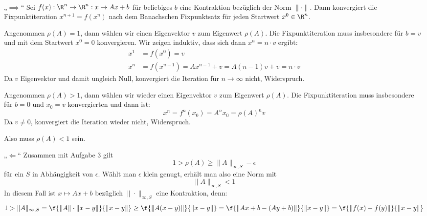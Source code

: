 \documentclass{mywork}
\begin{document}
	\begin{aufgabe}~

		\begin{seg}{„$\implies$“}
			Sei $f(x):\R^n\to\R^n:x\mapsto Ax+b$ für beliebiges $b$ eine Kontraktion bezüglich der Norm $\|\cdot\|$.
			Dann konvergiert die Fixpunktiteration $x^{n+1} = f(x^n)$ nach dem Banachschen Fixpunktsatz für jeden Startwert $x^0\in \R^n$.
			
			Angenommen $\rho(A)=1$, dann wählen wir einen Eigenvektor $v$ zum Eigenwert $\rho(A)$.
			Die Fixpunktiteration muss insbesondere für $b=v$ und mit dem Startwert $x^0=0$ konvergieren.
			Wir zeigen induktiv, dass sich dann $x^n=n\cdot v$ ergibt:
			\begin{align*}
				x^1 &= f(x^0) = v\\
				x^n &= f(x^{n-1}) = Ax^{n-1} + v = A(n-1)v + v = n\cdot v
			\end{align*}
			Da $v$ Eigenvektor und damit ungleich Null, konvergiert die Iteration für $n\to\infty$ nicht, Widerspruch.

			Angenommen $\rho(A)>1$, dann wählen wir wieder einen Eigenvektor $v$ zum Eigenwert $\rho(A)$.
			Die Fixpunktiteration muss insbesondere für $b=0$ und $x_0=v$ konvergierten und dann ist:
			\[
				x^n = f^n(x_0) = A^nx_0 = \rho(A)^nv
			\]
			Da $v\neq 0$, konvergiert die Iteration wieder nicht, Widerspruch.

			Also muss $\rho(A)<1$ sein.
		\end{seg}
		\begin{seg}{„$\Longleftarrow$“}
			Zusammen mit Aufgabe 3 gilt
			\[
				1 > \rho(A) \ge \|A\|_{\infty,S} - \epsilon
			\]
			für ein $S$ in Abhängigkeit von $\epsilon$.
			Wählt man $\epsilon$ klein genugt, erhält man also eine Norm mit
			\[
				\|A\|_{\infty,S} < 1
			\]
			In diesem Fall ist $x\mapsto Ax+b$ bezüglich $\|\cdot\|_{\infty,S}$ eine Kontraktion, denn:
			\[
				1 > \|A\|_{\infty,S} = \f{\|A\|\cdot\|x-y\|}{\|x-y\|} \ge \f{\|A(x-y)\|}{\|x-y\|} = \f{\|Ax+b -(Ay+b)\|}{\|x-y\|} = \f{\|f(x)-f(y)\|}{\|x-y\|}
			\]
		\end{seg}

	\end{aufgabe}
\end{document}
